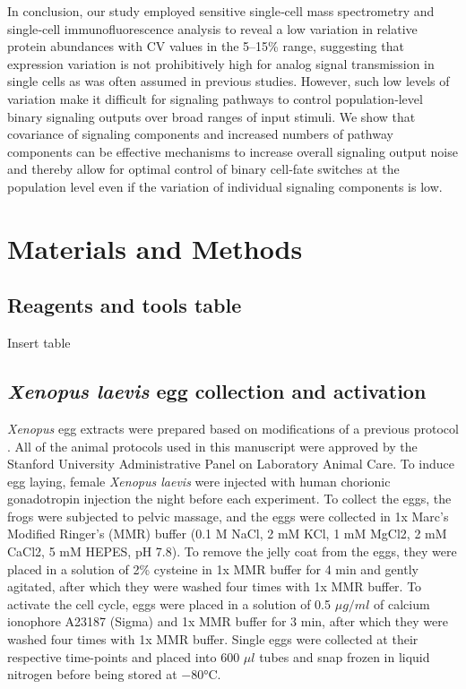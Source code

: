 In conclusion, our study employed sensitive single‐cell mass spectrometry and single‐cell immunofluorescence analysis to reveal a low variation in relative protein abundances with CV values in the 5–15\% range, suggesting that expression variation is not prohibitively high for analog signal transmission in single cells as was often assumed in previous studies. However, such low levels of variation make it difficult for signaling pathways to control population‐level binary signaling outputs over broad ranges of input stimuli. We show that covariance of signaling components and increased numbers of pathway components can be effective mechanisms to increase overall signaling output noise and thereby allow for optimal control of binary cell‐fate switches at the population level even if the variation of individual signaling components is low.

\section{Materials and Methods} \label{Materials and Methods}

\subsection{Reagents and tools table}
Insert table

\subsection{\emph{Xenopus laevis} egg collection and activation}

\emph{Xenopus} egg extracts were prepared based on modifications of a previous protocol \cite{Tsai2014}. All of the animal protocols used in this manuscript were approved by the Stanford University Administrative Panel on Laboratory Animal Care. To induce egg laying, female \emph{Xenopus laevis} were injected with human chorionic gonadotropin injection the night before each experiment. To collect the eggs, the frogs were subjected to pelvic massage, and the eggs were collected in 1x Marc's Modified Ringer's (MMR) buffer (0.1 M NaCl, 2 mM KCl, 1 mM MgCl2, 2 mM CaCl2, 5 mM HEPES, pH 7.8). To remove the jelly coat from the eggs, they were placed in a solution of 2\% cysteine in 1x MMR buffer for 4 min and gently agitated, after which they were washed four times with 1x MMR buffer. To activate the cell cycle, eggs were placed in a solution of 0.5 $\mu g/ml$ of calcium ionophore A23187 (Sigma) and 1x MMR buffer for 3 min, after which they were washed four times with 1x MMR buffer. Single eggs were collected at their respective time-points and placed into 600 $\mu l$ tubes and snap frozen in liquid nitrogen before being stored at $-80$\si{\degree}C.

